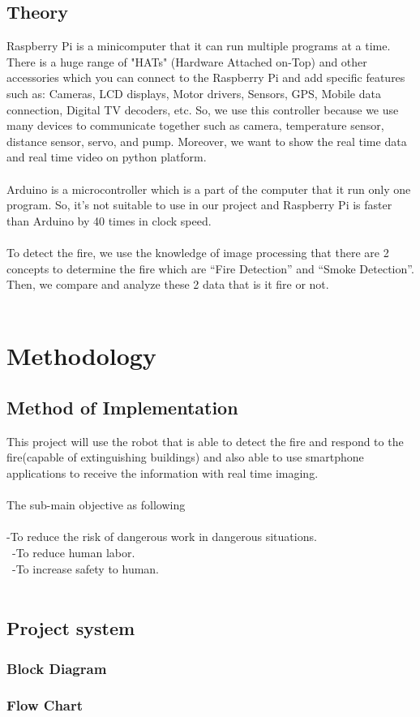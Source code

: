 \documentclass[a4paper,12pt]{article}
\begin{document}
 \subsection{Theory}
 Raspberry Pi is a minicomputer that it can run multiple programs at a time. There is a huge range of "HATs" (Hardware Attached on-Top) and other accessories which you can connect to the Raspberry Pi and add specific features such as: Cameras, LCD displays, Motor drivers, Sensors, GPS, Mobile data connection, Digital TV decoders, etc. So, we use this controller because we use many devices to communicate together such as camera, temperature sensor, distance sensor, servo, and pump. Moreover, we want to show the real time data and real time video on python platform.\\\\
 Arduino is a microcontroller which is a part of the computer that it run only one program. So, it’s not suitable to use in our project and Raspberry Pi is faster than Arduino by 40 times in clock speed.\\\\
To detect the fire, we use the knowledge of image processing that there are 2 concepts to determine the fire which are “Fire Detection” and “Smoke Detection”. Then, we compare and analyze these 2 data that is it fire or not.\\\\ 

 \section{Methodology }
 \subsection{Method of Implementation}
  This project will use the robot that is able to detect the fire and respond to the fire(capable of extinguishing buildings) and also able to use smartphone applications to receive the information with real time imaging.\\\\
The sub-main objective as following\\\\
-To reduce the risk of dangerous work in dangerous situations. \\\
-To reduce human labor. \\\
-To increase safety to human. \\\
 \newpage
 \subsection{Project system}
 \subsubsection{Block Diagram} 
 
 \subsubsection{Flow Chart }
\end{document}
